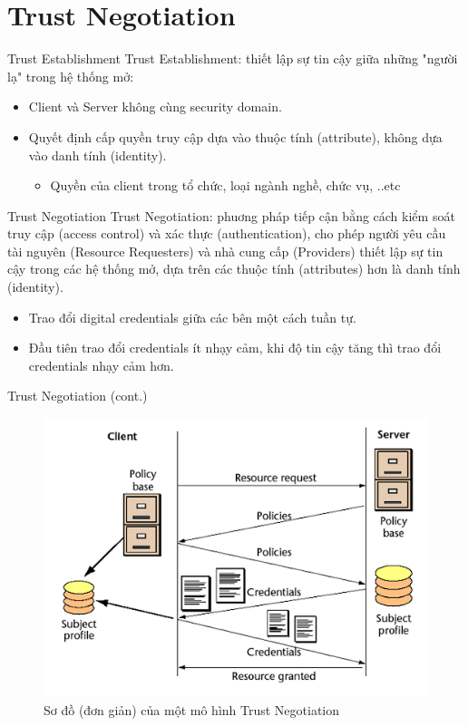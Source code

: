 \documentclass[11pt]{beamer}
\newcommand{\eg}{\text{e.g.\ }}
\begin{document}
\section{Trust Negotiation}
\begin{frame}{Trust Establishment}
Trust Establishment: thiết lập sự tin cậy giữa những "người lạ" trong hệ thống mở:
\begin{itemize}
\item Client và Server không cùng security domain.
\item Quyết định cấp quyền truy cập dựa vào thuộc tính (attribute), không dựa vào danh tính (identity).
\begin{itemize}
\item \eg Quyền của client trong tổ chức, loại ngành nghề, chức vụ, ..etc
\end{itemize}
\end{itemize}
\end{frame}

\begin{frame}{Trust Negotiation}
Trust Negotiation: phuơng pháp tiếp cận bằng cách kiểm soát truy cập (access control) và xác thực (authentication), cho phép người yêu cầu tài nguyên (Resource Requesters) và nhà cung cấp (Providers) thiết lập sự tin cậy trong các hệ thống mở, dựa trên các thuộc tính (attributes) hơn là danh tính (identity).
\begin{itemize}
\item Trao đổi digital credentials giữa các bên một cách tuần tự.
\item Đầu tiên trao đổi credentials ít nhạy cảm, khi độ tin cậy tăng thì trao đổi credentials nhạy cảm hơn.
\end{itemize}
\end{frame}


\begin{frame}{Trust Negotiation (cont.)}
\begin{figure}[H]
\centering
\includegraphics[scale=.4]{img/trust-simple.png}
\caption{Sơ đồ (đơn giản) của một mô hình Trust Negotiation}
\end{figure}
\end{frame}
\end{document}
